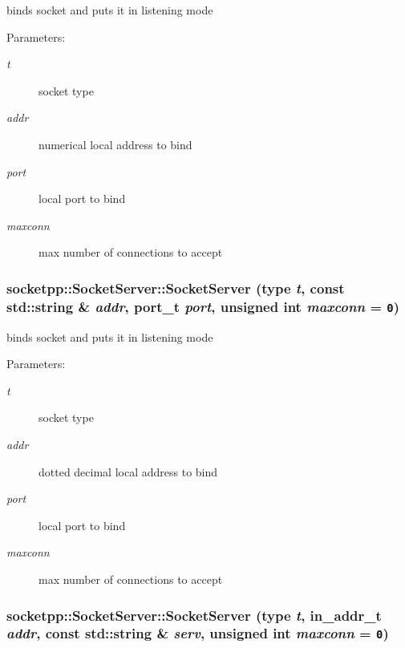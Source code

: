 binds socket and puts it in listening mode 

\begin{Desc}
\item[Parameters:]
\begin{description}
\item[{\em t}]socket type \item[{\em addr}]numerical local address to bind \item[{\em port}]local port to bind \item[{\em maxconn}]max number of connections to accept \end{description}
\end{Desc}
\hypertarget{classsocketpp_1_1SocketServer_2b43397fd614dc7953559d7372f1c6ca}{
\subsubsection[{SocketServer}]{\setlength{\rightskip}{0pt plus 5cm}socketpp::SocketServer::SocketServer (type {\em t}, \/  const std::string \& {\em addr}, \/  port\_\-t {\em port}, \/  unsigned int {\em maxconn} = {\tt 0})}}
\label{classsocketpp_1_1SocketServer_2b43397fd614dc7953559d7372f1c6ca}


binds socket and puts it in listening mode 

\begin{Desc}
\item[Parameters:]
\begin{description}
\item[{\em t}]socket type \item[{\em addr}]dotted decimal local address to bind \item[{\em port}]local port to bind \item[{\em maxconn}]max number of connections to accept \end{description}
\end{Desc}
\hypertarget{classsocketpp_1_1SocketServer_d1c5c7df1da1c52df7a1fae7df4488b1}{
\subsubsection[{SocketServer}]{\setlength{\rightskip}{0pt plus 5cm}socketpp::SocketServer::SocketServer (type {\em t}, \/  in\_\-addr\_\-t {\em addr}, \/  const std::string \& {\em serv}, \/  unsigned int {\em maxconn} = {\tt 0})}}
\label{classsocketpp_1_1SocketServer_d1c5c7df1da1c52df7a1fae7df4488b1}


